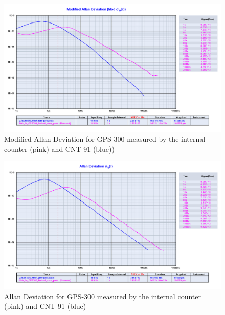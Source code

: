 \documentclass[11pt,english,a4paper]{article}
\begin{document}
\begin{figure}[!htb]
  \centering
    \includegraphics[width=1\textwidth]{part1_spm4_modified_allan.png}
      \caption{Modified Allan Deviation for GPS-300 measured by the internal counter (pink) and CNT-91 (blue))}
          \label{fig:part1_spm4_modified_allan}
\end{figure}

\begin{figure}[!htb]
  \centering
    \includegraphics[width=1\textwidth]{part1_spm4_allan.png}
      \caption{Allan Deviation for GPS-300 measured by the internal counter (pink) and CNT-91 (blue)}
          \label{fig:part1_spm4_allan}
\end{figure}
\end{document}
